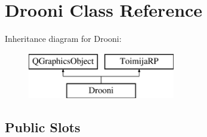 \hypertarget{class_drooni}{\section{Drooni Class Reference}
\label{class_drooni}
}
Inheritance diagram for Drooni\-:\begin{figure}[H]
\begin{center}
\leavevmode
\includegraphics[height=2.000000cm]{class_drooni}
\end{center}
\end{figure}
\subsection*{Public Slots}
